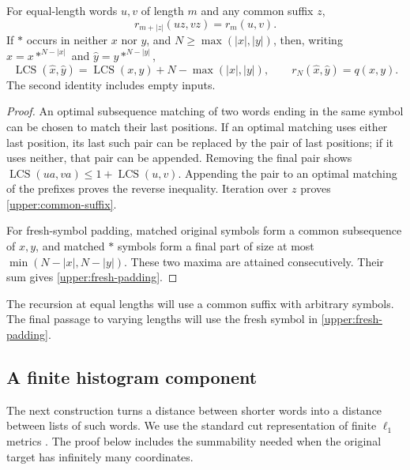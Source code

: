 \begin{lemma}\label{upper:padding}
For equal-length words $u,v$ of length $m$ and any common suffix $z$,
\begin{equation}\label{upper:common-suffix}
 r_{m+|z|}(uz,vz)=r_m(u,v).
\end{equation}
If $\ast$ occurs in neither $x$ nor $y$, and
$N\ge\max(|x|,|y|)$, then, writing
$\widehat x=x\ast^{N-|x|}$ and $\widehat y=y\ast^{N-|y|}$,
\begin{equation}\label{upper:fresh-padding}
 \operatorname{LCS}(\widehat x,\widehat y)
 =\operatorname{LCS}(x,y)+N-\max(|x|,|y|),\qquad
 r_N(\widehat x,\widehat y)=q(x,y).
\end{equation}
The second identity includes empty inputs.
\end{lemma}
\begin{proof}
An optimal subsequence matching of two words ending in the same symbol
can be chosen to match their last positions.  If an optimal matching uses
either last position, its last such pair can be replaced by the pair of
last positions; if it uses neither, that pair can be appended.  Removing
the final pair shows
$\operatorname{LCS}(ua,va)\le1+\operatorname{LCS}(u,v)$.
Appending the pair to an optimal matching of the prefixes proves the
reverse inequality.
Iteration over $z$ proves \eqref{upper:common-suffix}.

For fresh-symbol padding, matched original symbols form a common
subsequence of $x,y$, and matched $\ast$ symbols form a final part of
size at most $\min(N-|x|,N-|y|)$.  These two maxima are attained
consecutively.  Their sum gives \eqref{upper:fresh-padding}.
\end{proof}

The recursion at equal lengths will use a common suffix with arbitrary
symbols.  The final passage to varying lengths will use the fresh symbol
in \eqref{upper:fresh-padding}.

\subsection{A finite histogram component}

The next construction turns a distance between shorter words into a
distance between lists of such words.  We use the standard cut
representation of finite $\ell_1$ metrics
\cite[Section~4]{LinialLondonRabinovich1995}. The proof below includes the
summability needed when the original target has infinitely many coordinates.

